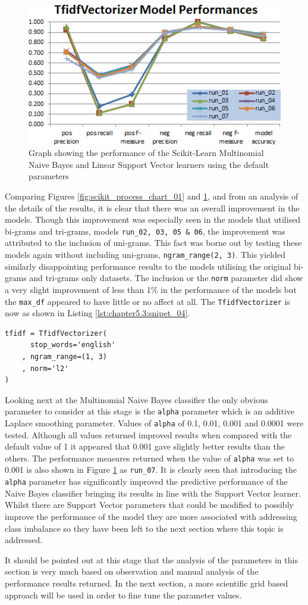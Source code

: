 \begin{figure}[htbp]
	\centering
	\includegraphics[width=.6\textwidth]{Figures/Chapter5/scikit_process_chart_02.jpg}
	\caption[Scikit-Learn model performance with default parameters]{Graph showing the performance of the Scikit-Learn Multinomial Naive Bayes and Linear Support Vector learners using the default parameters}
	\label{fig:scikit_process_chart_02}
\end{figure}

Comparing Figures \ref{fig:scikit_process_chart_01} and \ref{fig:scikit_process_chart_02}, and from an analysis of the details of the results, it is clear that there was an overall improvement in the models. Though this improvement was especially seen in the models that utilised bi-grams and tri-grams, models \verb|run_02, 03, 05 & 06|, the improvement was attributed to the inclusion of uni-grams. This fact was borne out by testing these models again without including uni-grams, \verb|ngram_range(2, 3)|. This yielded similarly disappointing performance results to the models utilising the original bi-grams and tri-grams only datasets. The inclusion or the \verb|norm| parameter did show a very slight improvement of less than 1\% in the performance of the models but the \verb|max_df| appeared to have little or no affect at all. The \verb|TfidfVectorizer| is now as shown in Listing \ref{lst:chapter5.3:snipet_04}.

\begin{lstlisting}[caption={TfidfVectorizer parameters}, label=lst:chapter5.3:snipet_04]
tfidf = TfidfVectorizer(
      stop_words='english'
    , ngram_range=(1, 3)
    , norm='l2'
)
\end{lstlisting}

Looking next at the Multinomial Naive Bayes classifier the only obvious parameter to consider at this stage is the \verb|alpha| parameter which is an additive Laplace smoothing parameter. Values of \verb|alpha| of 0.1, 0.01, 0.001 and 0.0001 were tested. Although all values returned improved results when compared with the default value of 1 it appeared that 0.001 gave slightly better results than the others. The performance measures returned when the value of \verb|alpha| was set to 0.001 is also shown in Figure \ref{fig:scikit_process_chart_02} as \verb|run_07|. It is clearly seen that introducing the \verb|alpha| parameter has significantly improved the predictive performance of the Naive Bayes classifier bringing its results in line with the Support Vector learner. Whilst there are Support Vector parameters that could be modified to possibly improve the performance of the model they are more associated with addressing class imbalance so they have been left to the next section where this topic is addressed.

It should be pointed out at this stage that the analysis of the parameters in this section is very much based on observation and manual analysis of the performance results returned. In the next section, a more scientific grid based approach will be used in order to fine tune the parameter values.

